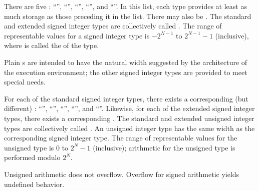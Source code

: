 \pnum
{}%
%
There are five  :
%
%
%
%
%
``'', ``'', ``'',
``'', and ``''. In
this list, each type provides at least as much storage as those
preceding it in the list.
%
%
There may also be 
.
The standard and extended signed integer types are collectively called
.
The range of representable values for a signed integer type is
$-2^{N-1}$ to $2^{N-1}-1$ (inclusive),
where  is called the  of the type.
%
\begin{note}
Plain s are intended to have
the natural width suggested by the architecture of the execution environment;
the other signed integer types are provided to meet special needs.
\end{note}

\pnum
{}%
%
For each of the standard signed integer types,
there exists a corresponding (but different)
%
:
%
%
%
%
%
``'', ``'',
``'', ``'', and
``''.
%
Likewise, for each of the extended signed integer types,
there exists a corresponding .
The standard and extended unsigned integer types
are collectively called .
An unsigned integer type has the same width 
as the corresponding signed integer type.
%
The range of representable values for the unsigned type is
$0$ to $2^N-1$ (inclusive);
arithmetic for the unsigned type is performed modulo $2^N$.
\begin{note}
Unsigned arithmetic does not overflow.
Overflow for signed arithmetic yields undefined behavior.
\end{note}

